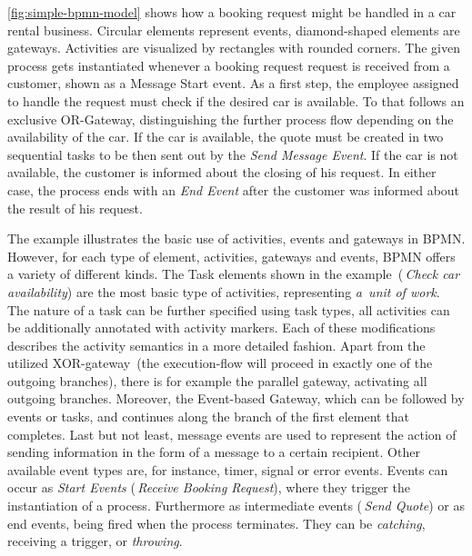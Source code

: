 \autoref{fig:simple-bpmn-model} shows how a booking request might be handled in a car rental business.
Circular elements represent events, diamond-shaped elements are gateways. Activities are visualized by rectangles with rounded corners.
The given process gets instantiated whenever a booking request request is received from a customer, shown as a Message Start event. 
As a first step, the employee assigned to handle the request must check if the desired car is available. To that follows an exclusive OR-Gateway, distinguishing the further process flow depending on the availability of the car.
If the car is available, the quote must be created in two sequential tasks to be then sent out by the \textit{Send Message Event}. If the car is not available, the customer is informed about the closing of his request. 
In either case, the process ends with an \textit{End Event} after the customer was informed about the result of his request.

The example illustrates the basic use of activities, events and gateways in BPMN. However, for each type of element, activities, gateways and events, BPMN offers a variety of different kinds.
The Task elements shown in the example~(\eg \,\textit{Check car availability}) are the most basic type of activities, representing \textit{a~unit of work}. The nature of a task can be further specified using task types, all activities can be additionally annotated with activity markers. Each of these modifications describes the activity semantics in a more detailed fashion.
Apart from the utilized XOR-gateway~(the execution-flow will proceed in exactly one of the outgoing branches), there is for example the parallel gateway, activating all outgoing branches. Moreover, the Event-based Gateway, which can be followed by events or tasks, and continues along the branch of the first element that completes.
Last but not least, message events are used to represent the action of sending information in the form of a message to a certain recipient. Other available event types are, for instance, timer, signal or error events. Events can occur as \textit{Start Events} (\eg \,\textit{Receive Booking Request}), where they trigger the instantiation of a process. Furthermore as intermediate events (\eg \,\textit{Send Quote}) or as end events, being fired when the process terminates. They can be \textit{catching}, \ie \,receiving a trigger, or \textit{throwing}.

